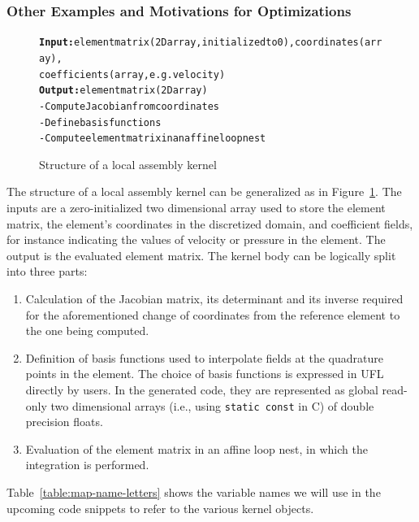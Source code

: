 \subsubsection{Other Examples and Motivations for Optimizations}
\label{sec:coffe-motivations}

\begin{figure}
\begin{alltt}
\scriptsize
\textbf{Input:} element matrix (2D array, initialized to 0), coordinates (array), 
       coefficients (array, e.g. velocity)
\textbf{Output:} element matrix (2D array)
- Compute Jacobian from coordinates
- Define basis functions
- Compute element matrix in an affine loop nest
\end{alltt}
\caption{Structure of a local assembly kernel}
\label{code:general-structure}
\end{figure}


The structure of a local assembly kernel can be generalized as in Figure~\ref{code:general-structure}. The inputs are a zero-initialized two dimensional array used to store the element matrix, the element's coordinates in the discretized domain, and coefficient fields, for instance indicating the values of velocity or pressure in the element. The output is the evaluated element matrix. The kernel body can be logically split into three parts:
\begin{enumerate}
  \item Calculation of the Jacobian matrix, its determinant and its
    inverse required for the aforementioned change of coordinates from
    the reference element to the one being computed.
  \item Definition of basis functions used to interpolate fields at the
    quadrature points in the element. The choice of basis functions is
    expressed in UFL directly by users. In the generated code, they are
    represented as global read-only two dimensional arrays (i.e., using
    \texttt{static const} in C) of double precision floats.
  \item Evaluation of the element matrix in an affine loop nest, in which
    the integration is performed.
\end{enumerate}
Table~\ref{table:map-name-letters} shows the variable names we will use in the upcoming code snippets to refer to the various kernel objects.

